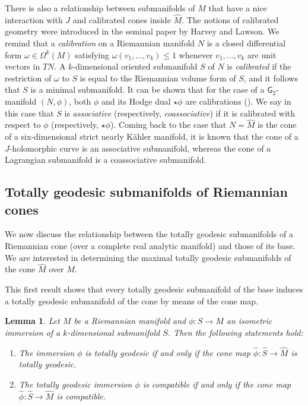 \documentclass[11pt,a4paper,final]{amsart}
\newcommand{\s}{\mathsf}
\renewcommand{\hat}{\widehat}
\newtheorem{lemma}[theorem]{Lemma}
\theoremstyle{definition}
\begin{document}
There is also a relationship between submanifolds of $M$ that have a nice interaction with $J$ and calibrated cones inside 
$\hat{M}$.
The notions of calibrated geometry were introduced in the seminal paper \cite{HarveyLawson} by Harvey and Lawson.
We remind that a \textit{calibration} on a Riemannian manifold $N$ is a closed differential form $\omega\in\Omega^{k}(M)$ satisfying
$
	\omega(v_{1},\dots,v_{k})\leq 1
$
whenever $v_{1},\dots,v_{k}$ are unit vectors in $TN$.
A $k$-dimensional oriented submanifold $S$ of $N$ is \textit{calibrated} if the restriction of $\omega$ to $S$ is equal to the Riemannian volume form of $S$, and it follows that $S$ is a minimal submanifold.
It can be shown that for the case of a $\s{G}_{2}$-manifold $(N,\phi)$, both $\phi$ and its Hodge dual $\star\phi$ are calibrations (\cite[Theorem~1.4 and Theorem~1.16]{HarveyLawson}).
We say in this case that $S$ is \textit{associative} (respectively, \textit{coassociative}) if it is calibrated with respect to $\phi$ (respectively, $\star\phi$).
Coming back to the case that $N=\hat{M}$ is the cone of a six-dimensional strict nearly K\"{a}hler manifold, it is known that the cone of a $J$-holomorphic curve is an associative submanifold, whereas the cone of a Lagrangian submanifold is a coassociative submanifold.

\subsection{Totally geodesic submanifolds of Riemannian cones}\label{subsec:tgcones}

We now discuss the relationship between the totally geodesic submanifolds of a Riemannian cone (over a complete real analytic manifold) and those of its base.
We are interested in determining the maximal totally geodesic submanifolds of the cone $\hat M$ over $M$.

This first result shows that every totally geodesic submanifold of the base induces a totally geodesic submanifold of the cone by means of the cone map.
\begin{lemma}
\label{lemma:tgcone}
Let $M$ be a Riemannian manifold and $\phi\colon S\to M$ an isometric immersion of a $k$-dimensional submanifold $S$. Then the following statements hold:
\begin{enumerate}[\rm (i)]
	\item\label{lemmaItem:tgcone} 
The immersion $\phi$ is totally geodesic  if and only if the cone map $\hat{\phi}\colon \hat{S}\to \hat{M}$ is totally geodesic.
\item\label{lemmaItem:tgconecompatible}
The totally geodesic immersion $\phi$ is compatible  if and only if the cone map $\hat{\phi}\colon \hat{S}\to \hat{M}$ is compatible. 
\end{enumerate}
\end{lemma}
\end{document}
